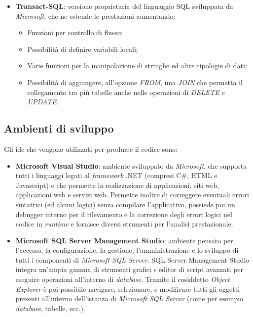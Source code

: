 \begin{itemize}
\item \textbf{Transact-SQL}: versione proprietaria del linguaggio SQL sviluppata da \textit{Microsoft}, che ne estende le prestazioni aumentando:
\begin{itemize}
\item Funzioni per controllo di flusso;
\item Possibilità di definire variabili locali;
\item Varie funzioni per la manipolazione di stringhe ed altre tipologie di dati;
\item Possibilità di aggiungere, all'opzione \textit{FROM}, una \textit{JOIN} che permetta il collegamento tra più tabelle anche nelle operazioni di \textit{DELETE} e \textit{UPDATE}.
\end{itemize}
\end{itemize}

\subsection{Ambienti di sviluppo}
\label{ambienti sviluppo}
Gli \acrshort{ide} che vengono utilizzati per produrre il codice sono:
\begin{itemize}
\item \textbf{Microsoft Visual Studio}: ambiente sviluppato da \textit{Microsoft}, che supporta tutti i linguaggi legati al \textit{framework} .NET (compresi C\#, HTML e Javascript) e che permette la realizzazione di applicazioni, siti web, applicazioni web e servizi web.  Permette inoltre di correggere eventuali errori sintattici (ed alcuni logici) senza compilare l'applicativo, possiede poi un debugger interno per il rilevamento e la correzione degli errori logici nel codice in \textit{runtime} e fornisce diversi strumenti per l'analisi prestazionale;
\item \textbf{Microsoft SQL Server Management Studio}: ambiente pensato per l'accesso, la configurazione, la gestione, l'amministrazione e lo sviluppo di tutti i componenti di \textit{Microsoft SQL Server}. SQL Server Management Studio integra un'ampia gamma di strumenti grafici e editor di script avanzati per eseguire operazioni all'interno di \textit{database}. Tramite il cosiddetto \textit{Object Explorer} è poi possibile navigare, selezionare, e modificare tutti gli oggetti presenti all'interno dell'istanza di \textit{Microsoft SQL Server} (come per esempio \textit{database}, tabelle, ecc.).
\end{itemize}


